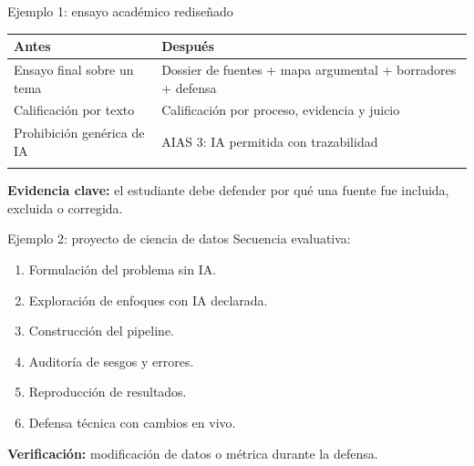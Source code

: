 \documentclass[
  ignorenonframetext,
  aspectratio=169,
  spanish,
]{beamer}
\newcounter{none} %
\providecommand{\tightlist}{%
  \setlength{\itemsep}{0pt}\setlength{\parskip}{0pt}}
\begin{document}
\begin{frame}{Ejemplo 1: ensayo académico rediseñado}
\protect{}\label{ejemplo-1-ensayo-acaduxe9mico-rediseuxf1ado}
{\def\LTcaptype{none} %
\begin{longtable}[]{@{}
  >{\raggedright\arraybackslash}p{}
  >{\raggedright\arraybackslash}p{}@{}}
\toprule\noalign{}
\begin{minipage}[b]{\linewidth}\raggedright
Antes
\end{minipage} & \begin{minipage}[b]{\linewidth}\raggedright
Después
\end{minipage} \\
\midrule\noalign{}
\endhead
Ensayo final sobre un tema & Dossier de fuentes + mapa argumental +
borradores + defensa \\
Calificación por texto & Calificación por proceso, evidencia y juicio \\
Prohibición genérica de IA & AIAS 3: IA permitida con trazabilidad \\
\bottomrule\noalign{}
\end{longtable}
}

\textbf{Evidencia clave:} el estudiante debe defender por qué una fuente
fue incluida, excluida o corregida.
\end{frame}

\begin{frame}{Ejemplo 2: proyecto de ciencia de datos}
\protect{}\label{ejemplo-2-proyecto-de-ciencia-de-datos}
Secuencia evaluativa:

\begin{enumerate}
\tightlist
\item
  Formulación del problema sin IA.
\item
  Exploración de enfoques con IA declarada.
\item
  Construcción del pipeline.
\item
  Auditoría de sesgos y errores.
\item
  Reproducción de resultados.
\item
  Defensa técnica con cambios en vivo.
\end{enumerate}

\textbf{Verificación:} modificación de datos o métrica durante la
defensa.
\end{frame}
\end{document}
